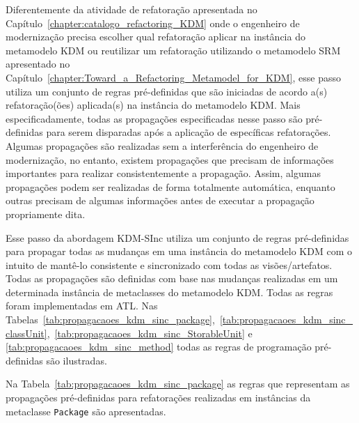 Diferentemente da atividade de refatoração apresentada no Capítulo~\ref{chapter:catalogo_refactoring_KDM} onde o engenheiro de modernização precisa escolher qual refatoração aplicar na instância do metamodelo KDM ou reutilizar um refatoração utilizando o metamodelo SRM apresentado no Capítulo~\ref{chapter:Toward_a_Refactoring_Metamodel_for_KDM}, esse passo utiliza um conjunto de regras pré-definidas que são iniciadas de acordo a(s) refatoração(ões) aplicada(s) na instância do metamodelo KDM. Mais especificadamente, todas as propagações especificadas nesse passo são pré-definidas para serem disparadas após a aplicação de específicas refatorações. Algumas propagações são realizadas sem a interferência do engenheiro de modernização, no entanto, existem propagações que precisam de informações importantes para realizar consistentemente a propagação. Assim, algumas propagações podem ser realizadas de forma totalmente automática, enquanto outras precisam de algumas informações antes de executar a propagação propriamente dita.

Esse passo da abordagem KDM-SInc utiliza um conjunto de regras pré-definidas para propagar todas as mudanças em uma instância do metamodelo KDM com o intuito de mantê-lo consistente e sincronizado com todas as visões/artefatos. Todas as propagações são definidas com base nas mudanças realizadas em um determinada instância de metaclasses do metamodelo KDM. Todas as regras foram implementadas em ATL. Nas Tabelas~\ref{tab:propagacaoes_kdm_sinc_package},~\ref{tab:propagacaoes_kdm_sinc_classUnit},~\ref{tab:propagacaoes_kdm_sinc_StorableUnit} e \ref{tab:propagacaoes_kdm_sinc_method} todas as regras de programação pré-definidas são ilustradas.  

Na Tabela~\ref{tab:propagacaoes_kdm_sinc_package} as regras que representam as propagações pré-definidas para refatorações realizadas em instâncias da metaclasse \texttt{Package} são apresentadas.


